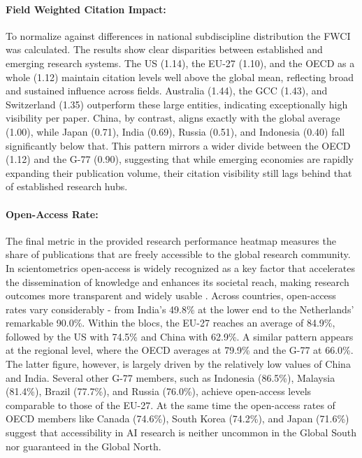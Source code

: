 \documentclass{article}
\begin{document}
	\paragraph{Field Weighted Citation Impact:} To normalize against differences in national subdiscipline distribution the FWCI was calculated. The results show clear disparities between established and emerging research systems. The US (1.14), the EU-27 (1.10), and the OECD as a whole (1.12) maintain citation levels well above the global mean, reflecting broad and sustained influence across fields. Australia (1.44), the GCC (1.43), and Switzerland (1.35) outperform these large entities, indicating exceptionally high visibility per paper. China, by contrast, aligns exactly with the global average (1.00), while Japan (0.71), India (0.69), Russia (0.51), and Indonesia (0.40) fall significantly below that. This pattern mirrors a wider divide between the OECD (1.12) and the G-77 (0.90), suggesting that while emerging economies are rapidly expanding their publication volume, their citation visibility still lags behind that of established research hubs.
	
	\paragraph{Open-Access Rate:}
	The final metric in the provided research performance heatmap measures the share of publications that are freely accessible to the global research community. In scientometrics open-access is widely recognized as a key factor that accelerates the dissemination of knowledge and enhances its societal reach, making research outcomes more transparent and widely usable \cite{Piwowar2018}. Across countries, open-access rates vary considerably - from India’s 49.8\% at the lower end to the Netherlands’ remarkable 90.0\%. Within the blocs, the EU-27 reaches an average of 84.9\%, followed by the US with 74.5\% and China with 62.9\%. A similar pattern appears at the regional level, where the OECD averages at 79.9\% and the G-77 at 66.0\%. The latter figure, however, is largely driven by the relatively low values of China and India. Several other G-77 members, such as Indonesia (86.5\%), Malaysia (81.4\%), Brazil (77.7\%), and Russia (76.0\%), achieve open-access levels comparable to those of the EU-27. At the same time the open-access rates of OECD members like Canada (74.6\%), South Korea (74.2\%), and Japan (71.6\%) suggest that accessibility in AI research is neither uncommon in the Global South nor guaranteed in the Global North.
	
\end{document}
